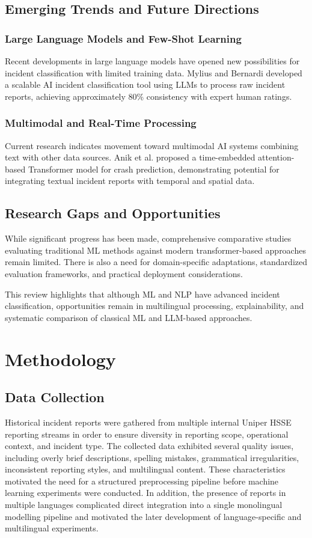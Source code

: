 \documentclass[11pt, titlepage, bibliography=totoc]{scrreprt}
\begin{document}
\section{Emerging Trends and Future Directions}

\subsection{Large Language Models and Few-Shot Learning}
Recent developments in large language models have opened new possibilities for incident classification with limited training data. Mylius and Bernardi \cite{mylius2025} developed a scalable AI incident classification tool using LLMs to process raw incident reports, achieving approximately 80\% consistency with expert human ratings.

\subsection{Multimodal and Real-Time Processing}
Current research indicates movement toward multimodal AI systems combining text with other data sources. Anik et al. \cite{anik2024} proposed a time-embedded attention-based Transformer model for crash prediction, demonstrating potential for integrating textual incident reports with temporal and spatial data.

\section{Research Gaps and Opportunities}
While significant progress has been made, comprehensive comparative studies evaluating traditional ML methods against modern transformer-based approaches remain limited. There is also a need for domain-specific adaptations, standardized evaluation frameworks, and practical deployment considerations.

This review highlights that although ML and NLP have advanced incident classification, opportunities remain in multilingual processing, explainability, and systematic comparison of classical ML and LLM-based approaches.

\chapter{Methodology}

\section{Data Collection}
Historical incident reports were gathered from multiple internal Uniper HSSE reporting streams in order to ensure diversity in reporting scope, operational context, and incident type. The collected data exhibited several quality issues, including overly brief descriptions, spelling mistakes, grammatical irregularities, inconsistent reporting styles, and multilingual content. These characteristics motivated the need for a structured preprocessing pipeline before machine learning experiments were conducted. In addition, the presence of reports in multiple languages complicated direct integration into a single monolingual modelling pipeline and motivated the later development of language-specific and multilingual experiments.
\end{document}
